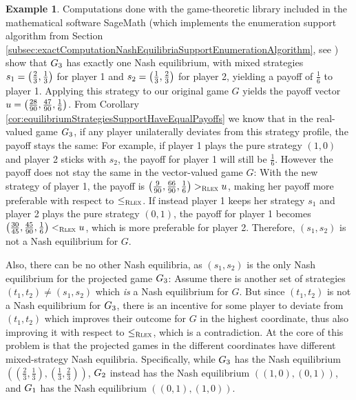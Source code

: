 \documentclass[a4paper,DIV=11]{scrreprt}
\theoremstyle{definition}
\newtheorem{ex}[thm]{Example} %
\begin{document}
\begin{ex}
        Computations done with the game-theoretic library included in the mathematical software {SageMath} (which implements the enumeration support algorithm from Section \ref{subsec:exactComputationNashEquilibriaSupportEnumerationAlgorithm}, see \cite{bib:sageNormalFormGameDocumentation})
        show that $G_{3}$ has exactly one Nash equilibrium, with mixed strategies $s_1 = \bigl(\frac{2}{3}, \frac{1}{3}\bigr)$ for player 1 and $s_2 = \bigl(\frac{1}{3}, \frac{2}{3}\bigr)$ for player 2, yielding a payoff of $\frac{1}{6}$ to player 1.
        Applying this strategy to our original game $G$ yields the payoff vector $u = \bigl(\frac{28}{90}, \frac{47}{90}, \frac{1}{6}\bigr)$.
        From Corollary \ref{cor:equilibriumStrategiesSupportHaveEqualPayoffs} we know that in the real-valued game $G_{3}$, if any player unilaterally deviates from this strategy profile, the payoff stays the same: 
        For example, if player 1 plays the pure strategy $(1, 0)$ and player 2 sticks with $s_2$, the payoff for player 1 will still be $\frac{1}{6}$.
        However the payoff does not stay the same in the vector-valued game $G$:
        With the new strategy of player 1, the payoff is $\bigl(\frac{9}{90}, \frac{66}{90}, \frac{1}{6}\bigr) >_{\textsc{Rlex}} u$, making her payoff more preferable with respect to $\leq_{\textsc{Rlex}}$.
        If instead player 1 keeps her strategy $s_1$ and player 2 plays the pure strategy $(0, 1)$, the payoff for player 1 becomes $\bigl(\frac{30}{45}, \frac{45}{90}, \frac{1}{6}\bigr) <_{\textsc{Rlex}} u$, which is more preferable for player 2.
        Therefore, $(s_1, s_2)$ is not a Nash equilibrium for $G$.
            
        Also, there can be no other Nash equilibria, as $(s_1, s_2)$ is the only Nash equilibrium for the projected game $G_{3}$: Assume there is another set of strategies $(t_1, t_2) \neq (s_1, s_2)$ which \emph{is} a Nash equilibrium for $G$. But since $(t_1, t_2)$ is not a Nash equilibrium for $G_{3}$, there is an incentive for some player to deviate from $(t_1, t_2)$ which improves their outcome for $G$ in the highest coordinate, thus also improving it with respect to $\leq_{\textsc{Rlex}}$, which is a contradiction.        
        At the core of this problem is that the projected games in the different coordinates have different mixed-strategy Nash equilibria.
        Specifically, while $G_{3}$ has the Nash equilibrium $((\frac{2}{3}, \frac{1}{3}), (\frac{1}{3}, \frac{2}{3}))$,
        $G_{2}$ instead has the Nash equilibrium $((1, 0), (0, 1))$, and $G_{1}$ has the Nash equilibrium $((0, 1), (1, 0))$.
    \end{ex}
\end{document}
